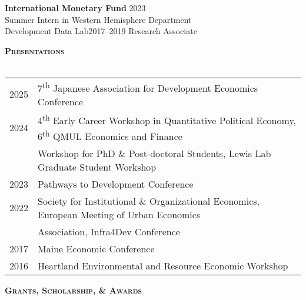 \documentclass[11pt]{article}
\newcommand{\lineunder}{\vspace*{-8pt} \\ \hspace*{-18pt} \hrulefill \\}
\newcommand{\header}[1]{{\hspace*{-15pt}\vspace*{6pt} \textsc{#1}} \vspace*{-6pt} \lineunder}
\newcommand{\schoolwithcourses}[4]{
 \textbf{#1} \hfill{#2}\\
    #3\\
\vspace*{5pt}
}
\begin{document}
\schoolwithcourses{International Monetary Fund}{2023}{\hspace{2mm} Summer Intern in Western Hemisphere Department}

\schoolwithcourses{Development Data Lab}{2017--2019}{\hspace{2mm} Research Associate}
\hfill{}
\vspace{1mm}



\header{\textbf{Presentations}}
\vspace{1mm}

\begin{tabular}{l @{\hspace{10ex}} l }
	2025 & 7\textsuperscript{th} Japanese Association for Development Economics Conference \\ 
	2024 & 4\textsuperscript{th} Early Career Workshop in Quantitative Political Economy, 6\textsuperscript{th} QMUL Economics and Finance \\
	& Workshop for PhD \& Post-doctoral Students, Lewis Lab Graduate Student Workshop \\
	2023 & Pathways to Development Conference \\
	2022 & Society for Institutional \& Organizational Economics, European Meeting of Urban Economics \\
	& Association, Infra4Dev Conference \\
	2017 & Maine Economic Conference \\
	2016 & Heartland Environmental and Resource Economic Workshop  \\
\end{tabular}
\vspace{1mm}
\hfill{}




\header{\textbf{Grants, Scholarship, \& Awards}}
\vspace{1mm}
\end{document}
